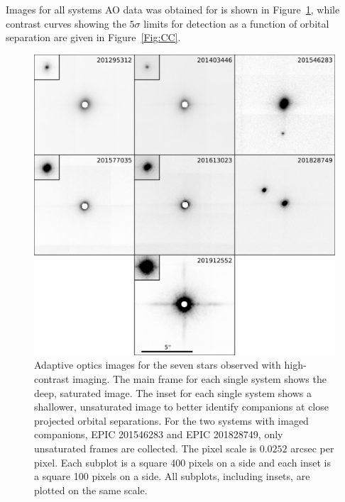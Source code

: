Images for all systems AO data was obtained for is shown in Figure~\ref{Fig:AO},
while contrast curves showing the $5\sigma$ limits for detection
as a function of orbital separation are given in Figure~\ref{Fig:CC}.

\begin{figure}[htbp]
\centerline{\includegraphics[width=1.0\textwidth]{chapter7/f3.pdf}}
\caption[Adaptive optics images for the seven stars observed with high-contrast imaging]{Adaptive optics images for the seven stars observed with high-contrast imaging.
The main frame for each single system shows the deep, saturated image.
The inset for each single system shows a shallower, unsaturated image to better
identify companions at close projected orbital separations.
For the two systems with imaged companions, EPIC 201546283 and
EPIC 201828749,
only unsaturated frames are collected.
The pixel scale is $0.0252$ arcsec per pixel.
Each subplot is a square 400 pixels on a side and
each inset is a square 100 pixels on a side.
All subplots, including insets, are plotted on the same scale.}
\label{Fig:AO}
\end{figure}

